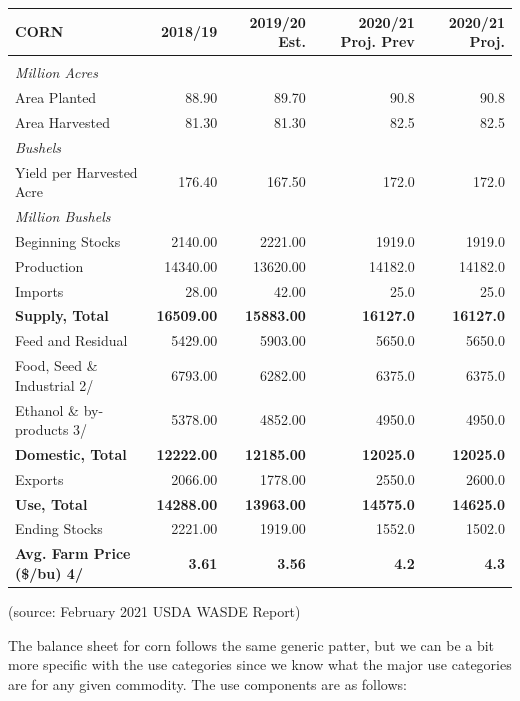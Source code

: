 \documentclass[
]{book}
\begin{document}
\begin{table}
\centering
\begin{tabular}{l|r|r|r|r}
\hline
CORN & 2018/19 & 2019/20 Est. & 2020/21 Proj. Prev & 2020/21 Proj.\\
\hline
 &  &  &  & \\
\hline
\em{Million Acres} & \em{} & \em{} & \em{} & \em{}\\
\hline
Area Planted & 88.90 & 89.70 & 90.8 & 90.8\\
\hline
Area Harvested & 81.30 & 81.30 & 82.5 & 82.5\\
\hline
\em{Bushels} & \em{} & \em{} & \em{} & \em{}\\
\hline
Yield per Harvested Acre & 176.40 & 167.50 & 172.0 & 172.0\\
\hline
\em{Million Bushels} & \em{} & \em{} & \em{} & \em{}\\
\hline
Beginning Stocks & 2140.00 & 2221.00 & 1919.0 & 1919.0\\
\hline
Production & 14340.00 & 13620.00 & 14182.0 & 14182.0\\
\hline
Imports & 28.00 & 42.00 & 25.0 & 25.0\\
\hline
\textbf{Supply, Total} & \textbf{16509.00} & \textbf{15883.00} & \textbf{16127.0} & \textbf{16127.0}\\
\hline
Feed and Residual & 5429.00 & 5903.00 & 5650.0 & 5650.0\\
\hline
Food, Seed \& Industrial 2/ & 6793.00 & 6282.00 & 6375.0 & 6375.0\\
\hline
Ethanol \& by-products 3/ & 5378.00 & 4852.00 & 4950.0 & 4950.0\\
\hline
\textbf{Domestic, Total} & \textbf{12222.00} & \textbf{12185.00} & \textbf{12025.0} & \textbf{12025.0}\\
\hline
Exports & 2066.00 & 1778.00 & 2550.0 & 2600.0\\
\hline
\textbf{Use, Total} & \textbf{14288.00} & \textbf{13963.00} & \textbf{14575.0} & \textbf{14625.0}\\
\hline
Ending Stocks & 2221.00 & 1919.00 & 1552.0 & 1502.0\\
\hline
\textbf{Avg. Farm Price (\$/bu)  4/} & \textbf{3.61} & \textbf{3.56} & \textbf{4.2} & \textbf{4.3}\\
\hline
\end{tabular}
\end{table}

(source: February 2021 USDA WASDE Report)

The balance sheet for corn follows the same generic patter, but we can be a bit more specific with the use categories since we know what the major use categories are for any given commodity. The use components are as follows:
\end{document}
